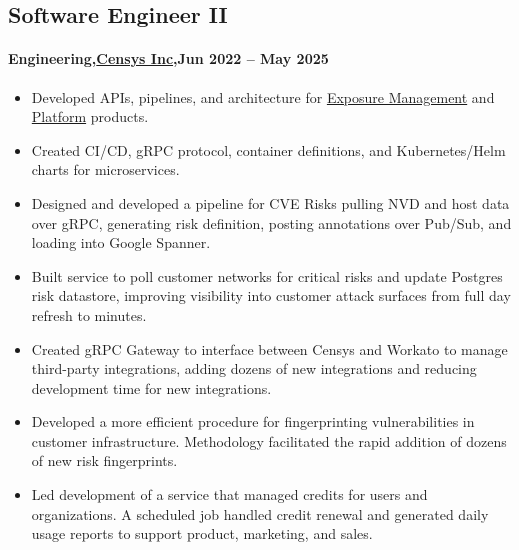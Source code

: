 \subsection{Software Engineer II}
\paragraph{Engineering,\href{https://censys.com}{Censys Inc},Jun 2022 -- May 2025}
\begin{itemize}
    \item Developed APIs, pipelines, and architecture for \href{https://censys.com/exposure-management/}{Exposure Management} and \href{censys.com/platform}{Platform} products.
    \item Created CI/CD, gRPC protocol, container definitions, and Kubernetes/Helm charts for microservices.
    \item Designed and developed a pipeline for CVE Risks pulling NVD and host data over gRPC, generating risk definition, posting annotations over Pub/Sub, and loading into Google Spanner.
    \item Built service to poll customer networks for critical risks and update Postgres risk datastore, improving visibility into customer attack surfaces from full day refresh to minutes.
    \item Created gRPC Gateway to interface between Censys and Workato to manage third-party integrations, adding dozens of new integrations and reducing development time for new integrations.
    \item Developed a more efficient procedure for fingerprinting vulnerabilities in customer infrastructure. Methodology facilitated the rapid addition of dozens of new risk fingerprints.
    \item Led development of a service that managed credits for users and organizations. A scheduled job handled credit renewal and generated daily usage reports to support product, marketing, and sales.

\end{itemize}
